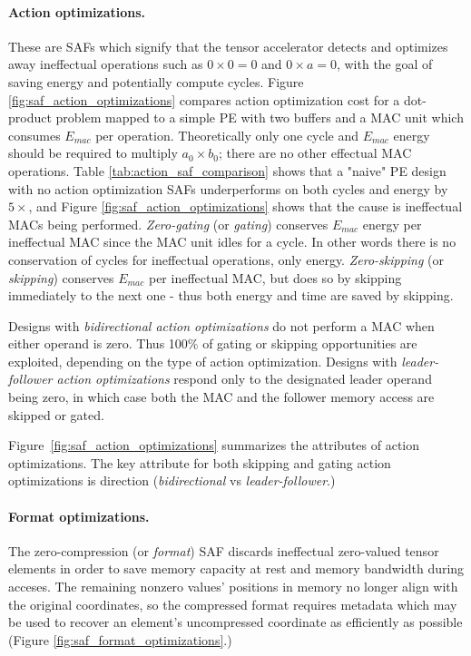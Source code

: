 \paragraph{Action optimizations.} These are SAFs which signify that the tensor accelerator detects and optimizes away ineffectual operations such as $0 \times 0 = 0$ and $0 \times a = 0$, with the goal of saving energy and potentially compute cycles. Figure \ref{fig:saf_action_optimizations} compares action optimization cost for a dot-product problem mapped to a simple PE with two buffers and a MAC unit which consumes $E_{mac}$ per operation. Theoretically only one cycle and $E_{mac}$ energy should be required to multiply $a_0 \times b_0$; there are no other effectual MAC operations. Table \ref{tab:action_saf_comparison} shows that a "naive" PE design with no action optimization SAFs underperforms on both cycles and energy by $5\times$, and Figure \ref{fig:saf_action_optimizations} shows that the cause is ineffectual MACs being performed. \textit{Zero-gating} (or \textit{gating}) conserves $E_{mac}$ energy per ineffectual MAC since the MAC unit idles for a cycle. In other words there is no conservation of cycles for ineffectual operations, only energy. \textit{Zero-skipping} (or \textit{skipping}) conserves $E_{mac}$ per ineffectual MAC, but does so by skipping immediately to the next one - thus both energy and time are saved by skipping. 

Designs with \textit{bidirectional action optimizations} do not perform a MAC when either operand is zero. Thus 100\% of gating or skipping opportunities are exploited, depending on the type of action optimization. Designs with \textit{leader-follower action optimizations} respond only to the designated leader operand being zero, in which case both the MAC and the follower memory access are skipped or gated.

Figure~\ref{fig:saf_action_optimizations} summarizes the attributes of action optimizations. The key attribute for both skipping and gating action optimizations is direction (\textit{bidirectional} vs \textit{leader-follower}.)

%
\paragraph{Format optimizations.} The zero-compression (or \textit{format}) SAF discards ineffectual zero-valued tensor elements in order to save memory capacity at rest and memory bandwidth during acceses. The remaining nonzero values' positions in memory no longer align with the original coordinates, so the compressed format requires metadata which may be used to recover an element's uncompressed coordinate as efficiently as possible (Figure \ref{fig:saf_format_optimizations}.) 

